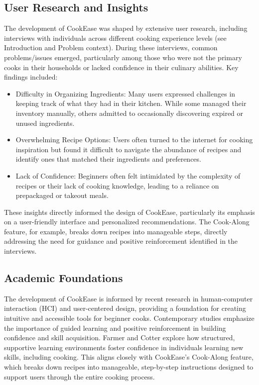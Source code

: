 \documentclass[10pt,twocolumn]{article}
\begin{document}
\subsection{User Research and Insights}
The development of CookEase was shaped by extensive user research, including interviews with individuals across different cooking experience levels (see Introduction and Problem context). During these interviews, common problems/issues emerged, particularly among those who were not the primary cooks in their households or lacked confidence in their culinary abilities. Key findings included:
\begin{itemize}
    \item Difficulty in Organizing Ingredients: Many users expressed challenges in keeping track of what they had in their kitchen. While some managed their inventory manually, others admitted to occasionally discovering expired or unused ingredients.
    \item Overwhelming Recipe Options: Users often turned to the internet for cooking inspiration but found it difficult to navigate the abundance of recipes and identify ones that matched their ingredients and preferences.
    \item Lack of Confidence: Beginners often felt intimidated by the complexity of recipes or their lack of cooking knowledge, leading to a reliance on prepackaged or takeout meals.
\end{itemize}
These insights directly informed the design of CookEase, particularly its emphasis on a user-friendly interface and personalized recommendations. The Cook-Along feature, for example, breaks down recipes into manageable steps, directly addressing the need for guidance and positive reinforcement identified in the interviews.

\subsection{Academic Foundations}
The development of CookEase is informed by recent research in human-computer interaction (HCI) and user-centered design, providing a foundation for creating intuitive and accessible tools for beginner cooks. Contemporary studies emphasize the importance of guided learning and positive reinforcement in building confidence and skill acquisition. Farmer and Cotter \cite{Farmer2021} explore how structured, supportive learning environments foster confidence in individuals learning new skills, including cooking. This aligns closely with CookEase’s Cook-Along feature, which breaks down recipes into manageable, step-by-step instructions designed to support users through the entire cooking process.
\end{document}

